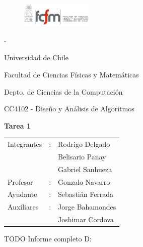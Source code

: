 \documentclass[letterpaper,10pt]{article}
\begin{document}
	\begin{titlepage}

		\begin{figure}
			\includegraphics[width=0.3\textwidth]{logoFCFM.png}
		\end{figure}

		\noindent \phantom - %

		Universidad de Chile

		Facultad de Ciencias Físicas y Matemáticas

		Depto. de Ciencias de la Computación

		CC4102 - Diseño y Análisis de Algoritmos

		\vfill

		\begin{center}
			\begin{Huge}
				{\textbf{Tarea 1}}
			\end{Huge}
		\end{center}

		\vfill

		\begin{flushright}
			\begin{tabular}{lll}
				Integrantes	&:	& Rodrigo Delgado\\
						&	& Belisario Panay\\
						&	& Gabriel Sanhueza\\
				Profesor	&:	& Gonzalo Navarro\\
				Ayudante	&:	& Sebastián Ferrada\\
				Auxiliares	&:	& Jorge Bahamondes\\
						&	& Joshimar Cordova\\
			\end{tabular}
		\end{flushright}

	\end{titlepage}

	\pagebreak

	TODO Informe completo D:
\end{document}
